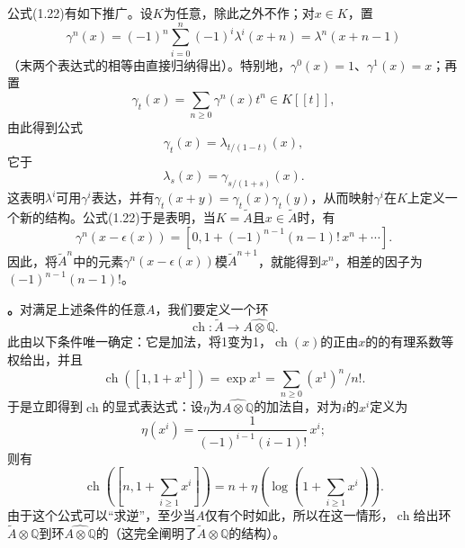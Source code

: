 公式(1.22)有如下推广。设$K$为任意，除此之外不作；对$x\in K$，置
\begin{equation}\gamma^n(x)=(-1)^n\sum_{i=0}^n(-1)^i\lambda^i(x+n)=\lambda^n(x+n-1)\tag{1.23}\end{equation}
（末两个表达式的相等由直接归纳得出）。特别地，$\gamma^0(x)=1$、$\gamma^1(x)=x$；再置
\begin{equation}\gamma_t(x)=\sum_{n\geq0}\gamma^n(x)t^n\in K[[t]],\tag{1.24}\end{equation}
由此得到公式
\begin{equation}\gamma_t(x)=\lambda_{t/(1-t)}(x),\tag{1.25}\end{equation}
它于
\begin{equation}\lambda_s(x)=\gamma_{s/(1+s)}(x).\tag{1.25 bis}\end{equation}
这表明$\lambda^i$可用$\gamma^i$表达，并有$\gamma_t(x+y)=\gamma_t(x)\gamma_t(y)$，从而映射$\gamma^i$在$K$上定义一个新的结构。公式(1.22)于是表明，当$K=\widetilde A$且$x\in\widetilde A$时，有
\begin{equation}\gamma^n(x-\epsilon(x))=[0,1+(-1)^{n-1}(n-1)!\,x^n+\cdots].\tag{1.22 bis}\end{equation}
因此，将$\widetilde A^n$中的元素$\gamma^n(x-\epsilon(x))$模$\widetilde A^{n+1}$，就能得到$x^n$，相差的因子为$(-1)^{n-1}(n-1)!$。

\textbf{。}对满足上述条件的任意$A$，我们要定义一个环
\begin{equation}\operatorname{ch}:\widetilde A\longrightarrow\widehat{A\otimes\mathbb Q}.\tag{1.26}\end{equation}
此由以下条件唯一确定：它是加法，将1变为1，$\operatorname{ch}(x)$的正由$x$的的有理系数等权给出，并且
\begin{equation}\operatorname{ch}([1,1+x^1])=\exp x^1=\sum_{n\geq0}(x^1)^n/n!.\tag{1.27}\end{equation}
于是立即得到$\operatorname{ch}$的显式表达式：设$\eta$为$\widehat{A\otimes\mathbb Q}$的加法自，对为$i$的$x^i$定义为
\begin{equation}\eta(x^i)=\frac{1}{(-1)^{i-1}(i-1)!}\,x^i;\tag{1.28}\end{equation}
则有
\begin{equation}\operatorname{ch}\left([n,1+\sum_{i\geq1}x^i]\right)
=n+\eta\left(\log\left(1+\sum_{i\geq1}x^i\right)\right).\tag{1.29}\end{equation}
由于这个公式可以“求逆”，至少当$A$仅有个时如此，所以在这一情形，$\operatorname{ch}$给出环$\widetilde A\otimes\mathbb Q$到环$\widehat{A\otimes\mathbb Q}$的（这完全阐明了$\widetilde A\otimes\mathbb Q$的结构）。

